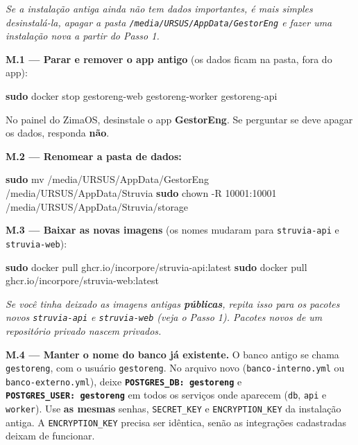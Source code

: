 \documentclass[
  10pt,
]{article}
\newenvironment{Shaded}{\begin{snugshade}}{\end{snugshade}}
\newcommand{\AttributeTok}[1]{\textcolor[rgb]{0.13,0.29,0.53}{#1}}
\newcommand{\FunctionTok}[1]{\textcolor[rgb]{0.13,0.29,0.53}{\textbf{#1}}}
\newcommand{\NormalTok}[1]{#1}
\renewenvironment{quote}{\begin{oldquote}\small\itshape}{\end{oldquote}}
\begin{document}
\begin{quote}
Se a instalação antiga ainda não tem dados importantes, é mais simples
desinstalá-la, apagar a pasta \texttt{/media/URSUS/AppData/GestorEng} e
fazer uma instalação nova a partir do Passo 1.
\end{quote}

\textbf{M.1 --- Parar e remover o app antigo} (os dados ficam na pasta,
fora do app):

\begin{Shaded}
\begin{Highlighting}[]
\FunctionTok{sudo}\NormalTok{ docker stop gestoreng{-}web gestoreng{-}worker gestoreng{-}api}
\end{Highlighting}
\end{Shaded}

No painel do ZimaOS, desinstale o app \textbf{GestorEng}. Se perguntar
se deve apagar os dados, responda \textbf{não}.

\textbf{M.2 --- Renomear a pasta de dados:}

\begin{Shaded}
\begin{Highlighting}[]
\FunctionTok{sudo}\NormalTok{ mv /media/URSUS/AppData/GestorEng /media/URSUS/AppData/Struvia}
\FunctionTok{sudo}\NormalTok{ chown }\AttributeTok{{-}R}\NormalTok{ 10001:10001 /media/URSUS/AppData/Struvia/storage}
\end{Highlighting}
\end{Shaded}

\textbf{M.3 --- Baixar as novas imagens} (os nomes mudaram para
\texttt{struvia-api} e \texttt{struvia-web}):

\begin{Shaded}
\begin{Highlighting}[]
\FunctionTok{sudo}\NormalTok{ docker pull ghcr.io/incorpore/struvia{-}api:latest}
\FunctionTok{sudo}\NormalTok{ docker pull ghcr.io/incorpore/struvia{-}web:latest}
\end{Highlighting}
\end{Shaded}

\begin{quote}
Se você tinha deixado as imagens antigas \textbf{públicas}, repita isso
para os pacotes novos \texttt{struvia-api} e \texttt{struvia-web} (veja
o Passo 1). Pacotes novos de um repositório privado nascem privados.
\end{quote}

\textbf{M.4 --- Manter o nome do banco já existente.} O banco antigo se
chama \texttt{gestoreng}, com o usuário \texttt{gestoreng}. No arquivo
novo (\texttt{banco-interno.yml} ou \texttt{banco-externo.yml}), deixe
\textbf{\texttt{POSTGRES\_DB:\ gestoreng}} e
\textbf{\texttt{POSTGRES\_USER:\ gestoreng}} em todos os serviços onde
aparecem (\texttt{db}, \texttt{api} e \texttt{worker}). Use \textbf{as
mesmas} senhas, \texttt{SECRET\_KEY} e \texttt{ENCRYPTION\_KEY} da
instalação antiga. A \texttt{ENCRYPTION\_KEY} precisa ser idêntica,
senão as integrações cadastradas deixam de funcionar.
\end{document}
